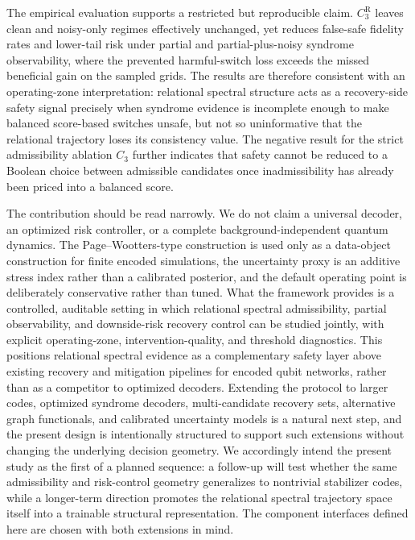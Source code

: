 \documentclass{iopjournal}
\begin{document}
The empirical evaluation supports a restricted but reproducible claim.
$C_3^{\mathrm R}$ leaves clean and noisy-only regimes effectively
unchanged, yet reduces false-safe fidelity rates and lower-tail risk
under partial and partial-plus-noisy syndrome observability, where the
prevented harmful-switch loss exceeds the missed beneficial gain on the
sampled grids. The results are therefore consistent with an
operating-zone interpretation: relational spectral structure acts as a
recovery-side safety signal precisely when syndrome evidence is
incomplete enough to make balanced score-based switches unsafe, but not
so uninformative that the relational trajectory loses its consistency
value. The negative result for the strict admissibility ablation $C_3$
further indicates that safety cannot be reduced to a Boolean choice
between admissible candidates once inadmissibility has already been
priced into a balanced score. 

The contribution should be read narrowly. We do not claim a universal
decoder, an optimized risk controller, or a complete
background-independent quantum dynamics. The Page--Wootters-type
construction is used only as a data-object construction for finite
encoded simulations, the uncertainty proxy is an additive stress index
rather than a calibrated posterior, and the default operating point is
deliberately conservative rather than tuned. What the framework
provides is a controlled, auditable setting in which relational
spectral admissibility, partial observability, and downside-risk
recovery control can be studied jointly, with explicit operating-zone,
intervention-quality, and threshold diagnostics. This positions
relational spectral evidence as a complementary safety layer above
existing recovery and mitigation pipelines for encoded qubit networks,
rather than as a competitor to optimized decoders. Extending the
protocol to larger codes, optimized syndrome decoders, multi-candidate
recovery sets, alternative graph functionals, and calibrated
uncertainty models is a natural next step, and the present design is
intentionally structured to support such extensions without changing
the underlying decision geometry. We accordingly intend the present 
study as the first of a planned sequence: a follow-up will test 
whether the same admissibility and risk-control geometry generalizes 
to nontrivial stabilizer codes, while a longer-term direction promotes 
the relational spectral trajectory space itself into a trainable 
structural representation. The component interfaces defined here are 
chosen with both extensions in mind.
\end{document}
